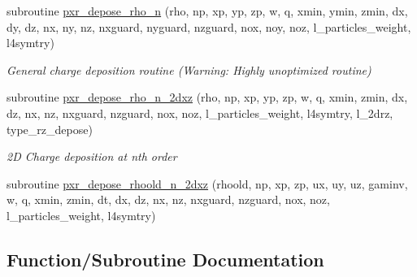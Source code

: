 \begin{DoxyCompactItemize}
subroutine \hyperlink{charge__deposition_8_f90_a1ba91732b5b34c8c04f7570c8df67c26}{pxr\+\_\+depose\+\_\+rho\+\_\+n} (rho, np, xp, yp, zp, w, q, xmin, ymin, zmin, dx, dy, dz, nx, ny, nz, nxguard, nyguard, nzguard, nox, noy, noz, l\+\_\+particles\+\_\+weight, l4symtry)
\begin{DoxyCompactList}\small\item\em General charge deposition routine (Warning\+: Highly unoptimized routine) \end{DoxyCompactList}\item 
subroutine \hyperlink{charge__deposition_8_f90_a899c2820e69c525f781f0a6c62d3b116}{pxr\+\_\+depose\+\_\+rho\+\_\+n\+\_\+2dxz} (rho, np, xp, yp, zp, w, q, xmin, zmin, dx, dz, nx, nz, nxguard, nzguard, nox, noz, l\+\_\+particles\+\_\+weight, l4symtry, l\+\_\+2drz, type\+\_\+rz\+\_\+depose)
\begin{DoxyCompactList}\small\item\em 2D Charge deposition at nth order \end{DoxyCompactList}\item 
subroutine \hyperlink{charge__deposition_8_f90_a496878f2bdf85d8dec4a059d6bc40a0f}{pxr\+\_\+depose\+\_\+rhoold\+\_\+n\+\_\+2dxz} (rhoold, np, xp, zp, ux, uy, uz, gaminv, w, q, xmin, zmin, dt, dx, dz, nx, nz, nxguard, nzguard, nox, noz, l\+\_\+particles\+\_\+weight, l4symtry)
\end{DoxyCompactItemize}


\subsection{Function/\+Subroutine Documentation}
